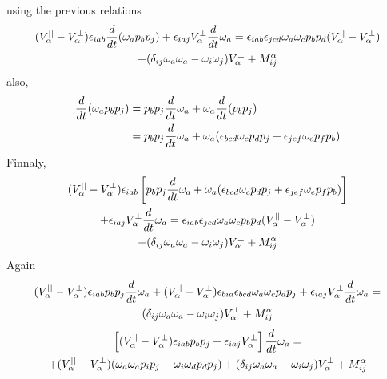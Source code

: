 using the previous relations 
\begin{multline*}
    (V_\alpha^{||} - V_\alpha^\bot)\epsilon_{iab}\frac{d}{d t}(\omega_a p_bp_j)
    + \epsilon_{iaj} V_\alpha^\bot \frac{d}{d t} \omega_a
    = 
    \epsilon_{iab} \epsilon_{jcd}
    \omega_a
    \omega_c
    p_bp_d (V_\alpha^{||} - V_\alpha^\bot) \\
    + (\delta_{ij} 
    \omega_a
    \omega_a
     - \omega_i \omega_j)
     V_\alpha^\bot 
    + M^\alpha_{ij}
\end{multline*}
also, 
\begin{align*}
    \frac{d}{d t}(\omega_a p_bp_j)
    &= p_bp_j \frac{d}{d t}\omega_a 
    + \omega_a \frac{d}{d t}( p_bp_j)\\
    &= p_bp_j \frac{d}{d t}\omega_a 
    + \omega_a (
        \epsilon_{bcd} \omega_c p_dp_j 
        + \epsilon_{jef} \omega_e p_fp_b
    )\\
\end{align*}
Finnaly, 
\begin{multline*}
    (V_\alpha^{||} - V_\alpha^\bot)\epsilon_{iab}
    \left[
        p_bp_j \frac{d}{d t}\omega_a 
        + \omega_a (
            \epsilon_{bcd} \omega_c p_dp_j 
            + \epsilon_{jef} \omega_e p_fp_b
        )
    \right]\\
    + \epsilon_{iaj} V_\alpha^\bot \frac{d}{d t} \omega_a
    = 
    \epsilon_{iab} \epsilon_{jcd}
    \omega_a
    \omega_c
    p_bp_d (V_\alpha^{||} - V_\alpha^\bot) \\
    + (\delta_{ij} 
    \omega_a
    \omega_a
     - \omega_i \omega_j)
     V_\alpha^\bot 
    + M^\alpha_{ij}
\end{multline*}
Again 
\begin{multline*}
    (V_\alpha^{||} - V_\alpha^\bot)\epsilon_{iab}p_bp_j \frac{d}{d t}\omega_a 
    + (V_\alpha^{||} - V_\alpha^\bot)\epsilon_{bia} \epsilon_{bcd} \omega_a\omega_c p_dp_j 
    + \epsilon_{iaj} V_\alpha^\bot \frac{d}{d t} \omega_a
    = \\
     (\delta_{ij} 
    \omega_a
    \omega_a
     - \omega_i \omega_j)
     V_\alpha^\bot 
    + M^\alpha_{ij}
\end{multline*}
\begin{multline*}
    \left[
        (V_\alpha^{||} - V_\alpha^\bot)\epsilon_{iab}p_bp_j 
        + \epsilon_{iaj} V_\alpha^\bot 
    \right]\frac{d}{d t} \omega_a
    = \\
    + (V_\alpha^{||} - V_\alpha^\bot)
    (
        \omega_a \omega_a p_ip_j 
        - 
        \omega_i \omega_d p_d p_j 
    )
     + (\delta_{ij} 
    \omega_a
    \omega_a
     - \omega_i \omega_j)
     V_\alpha^\bot 
    + M^\alpha_{ij}
\end{multline*}
